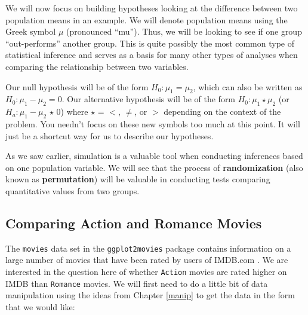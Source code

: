 \documentclass[]{tufte-book}
\newenvironment{Shaded}{\begin{snugshade}}{\end{snugshade}}
\newcommand{\KeywordTok}[1]{\textcolor[rgb]{0.13,0.29,0.53}{\textbf{{#1}}}}
\newcommand{\StringTok}[1]{\textcolor[rgb]{0.31,0.60,0.02}{{#1}}}
\newcommand{\NormalTok}[1]{{#1}}
\begin{document}
We will now focus on building hypotheses looking at the difference
between two population means in an example. We will denote population
means using the Greek symbol \(\mu\) (pronounced ``mu''). Thus, we will
be looking to see if one group ``out-performs'' another group. This is
quite possibly the most common type of statistical inference and serves
as a basis for many other types of analyses when comparing the
relationship between two variables.

Our null hypothesis will be of the form \(H_0: \mu_1 = \mu_2\), which
can also be written as \(H_0: \mu_1 - \mu_2 = 0\). Our alternative
hypothesis will be of the form \(H_0: \mu_1 \star \mu_2\) (or
\(H_a: \mu_1 - \mu_2 \, \star \, 0\)) where \(\star\) = \(<\), \(\ne\),
or \(>\) depending on the context of the problem. You needn't focus on
these new symbols too much at this point. It will just be a shortcut way
for us to describe our hypotheses.

As we saw earlier, simulation is a valuable tool when conducting
inferences based on one population variable. We will see that the
process of \textbf{randomization} (also known as \textbf{permutation})
will be valuable in conducting tests comparing quantitative values from
two groups.

\subsection{Comparing Action and Romance
Movies}\label{comparing-action-and-romance-movies}

The \texttt{movies} data set in the \texttt{ggplot2movies} package
contains information on a large number of movies that have been rated by
users of IMDB.com \citep{R-ggplot2movies}. We are interested in the
question here of whether \texttt{Action} movies are rated higher on IMDB
than \texttt{Romance} movies. We will first need to do a little bit of
data manipulation using the ideas from Chapter \ref{manip} to get the
data in the form that we would like:

\begin{Shaded}
\end{Shaded}
\end{document}
